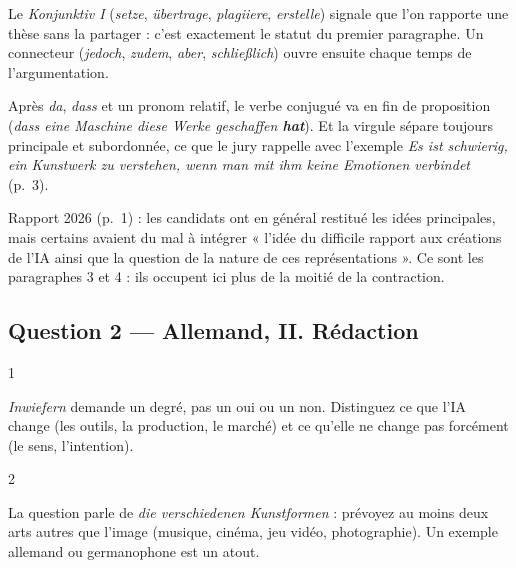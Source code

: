 \documentclass[11pt,a4paper]{article}
\begin{document}
\begin{methode}

Le \emph{Konjunktiv I} (\emph{setze}, \emph{übertrage}, \emph{plagiiere}, \emph{erstelle}) signale que l'on rapporte une thèse sans la partager : c'est exactement le statut du premier paragraphe. Un connecteur (\emph{jedoch}, \emph{zudem}, \emph{aber}, \emph{schließlich}) ouvre ensuite chaque temps de l'argumentation.

\end{methode}

\begin{piege}

Après \emph{da}, \emph{dass} et un pronom relatif, le verbe conjugué va en fin de proposition (\emph{dass eine Maschine diese Werke geschaffen \textbf{hat}}). Et la virgule sépare toujours principale et subordonnée, ce que le jury rappelle avec l'exemple \emph{Es ist schwierig, ein Kunstwerk zu verstehen, wenn man mit ihm keine Emotionen verbindet} (p.~3).

\end{piege}

\begin{jury}

Rapport 2026 (p.~1) : les candidats ont en général restitué les idées principales, mais certains avaient du mal à intégrer « l'idée du difficile rapport aux créations de l'IA ainsi que la question de la nature de ces représentations ». Ce sont les paragraphes 3 et 4 : ils occupent ici plus de la moitié de la contraction.

\end{jury}

\hypertarget{question-2-allemand-ii.-ruxe9daction}{%
\subsection{Question 2 --- Allemand, II. Rédaction}\label{question-2-allemand-ii.-ruxe9daction}}

\begin{indication}{1}

\emph{Inwiefern} demande un degré, pas un oui ou un non. Distinguez ce que l'IA change (les outils, la production, le marché) et ce qu'elle ne change pas forcément (le sens, l'intention).

\end{indication}

\begin{indication}{2}

La question parle de \emph{die verschiedenen Kunstformen} : prévoyez au moins deux arts autres que l'image (musique, cinéma, jeu vidéo, photographie). Un exemple allemand ou germanophone est un atout.

\end{indication}
\end{document}
